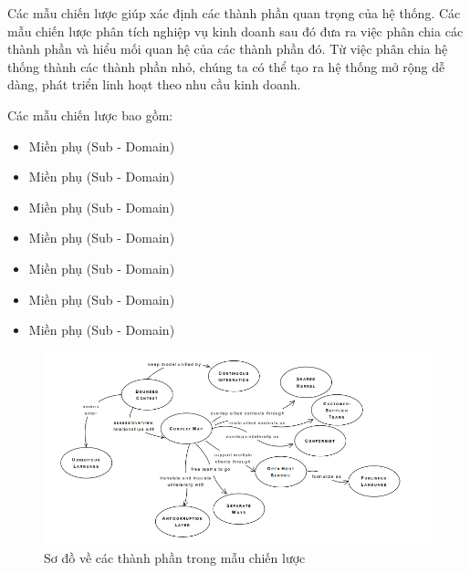 Các mẫu chiến lược giúp xác định các thành phần quan trọng của hệ thống.      Các mẫu chiến lược phân tích nghiệp vụ kinh doanh sau đó đưa ra việc phân chia các thành phần và hiểu mối quan hệ của các thành phần đó.     Từ việc phân chia hệ thống thành các thành phần nhỏ, chúng ta có thể tạo ra hệ thống mở rộng dễ dàng, phát triển linh hoạt theo nhu cầu kinh doanh.

Các mẫu chiến lược bao gồm:

\begin{itemize}

\item Miền phụ (Sub - Domain)













\item Miền phụ (Sub - Domain)

\item Miền phụ (Sub - Domain)

\item Miền phụ (Sub - Domain)

\item Miền phụ (Sub - Domain)

\item Miền phụ (Sub - Domain)

\item Miền phụ (Sub - Domain)

\end{itemize}

\begin{figure}[H]

\centering

\includegraphics[scale = 0.9]{pictures/cac_mau_chien_luoc/temp.png}

\caption{Sơ đồ về các thành phần trong mẫu chiến lược}

\end{figure}

